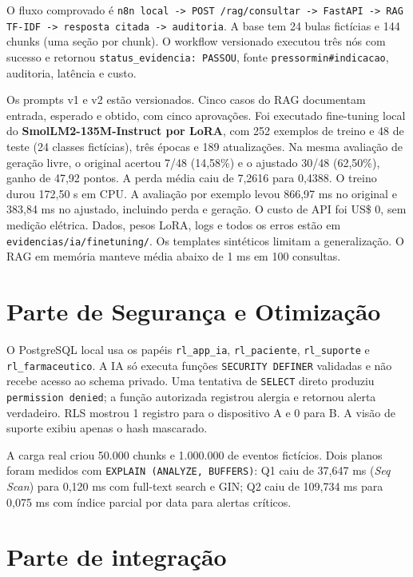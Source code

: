 \documentclass[10pt,a4paper]{article}
\begin{document}
O fluxo comprovado é \texttt{n8n local -> POST /rag/consultar -> FastAPI -> RAG TF-IDF -> resposta citada -> auditoria}. A base tem 24 bulas fictícias e 144 chunks (uma seção por chunk). O workflow versionado executou três nós com sucesso e retornou \texttt{status\_evidencia: PASSOU}, fonte \texttt{pressormin\#indicacao}, auditoria, latência e custo.

Os prompts v1 e v2 estão versionados. Cinco casos do RAG documentam entrada, esperado e obtido, com cinco aprovações. Foi executado fine-tuning local do \textbf{SmolLM2-135M-Instruct por LoRA}, com 252 exemplos de treino e 48 de teste (24 classes fictícias), três épocas e 189 atualizações. Na mesma avaliação de geração livre, o original acertou 7/48 (14,58\%) e o ajustado 30/48 (62,50\%), ganho de 47,92 pontos. A perda média caiu de 7,2616 para 0,4388. O treino durou 172,50 s em CPU. A avaliação por exemplo levou 866,97 ms no original e 383,84 ms no ajustado, incluindo perda e geração. O custo de API foi US\$ 0, sem medição elétrica. Dados, pesos LoRA, logs e todos os erros estão em \texttt{evidencias/ia/finetuning/}. Os templates sintéticos limitam a generalização. O RAG em memória manteve média abaixo de 1 ms em 100 consultas.

\newpage

\section*{Parte de Segurança e Otimização}

O PostgreSQL local usa os papéis \texttt{rl\_app\_ia}, \texttt{rl\_paciente}, \texttt{rl\_suporte} e \texttt{rl\_farmaceutico}. A IA só executa funções \texttt{SECURITY DEFINER} validadas e não recebe acesso ao schema privado. Uma tentativa de \texttt{SELECT} direto produziu \texttt{permission denied}; a função autorizada registrou alergia e retornou alerta verdadeiro. RLS mostrou 1 registro para o dispositivo A e 0 para B. A visão de suporte exibiu apenas o hash mascarado.

A carga real criou 50.000 chunks e 1.000.000 de eventos fictícios. Dois planos foram medidos com \texttt{EXPLAIN (ANALYZE, BUFFERS)}: Q1 caiu de 37,647 ms (\textit{Seq Scan}) para 0,120 ms com full-text search e GIN; Q2 caiu de 109,734 ms para 0,075 ms com índice parcial por data para alertas críticos.

\section*{Parte de integração}
\end{document}
